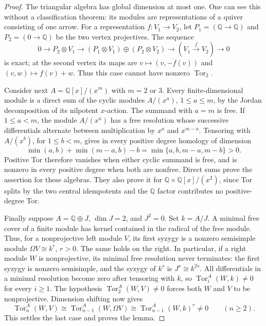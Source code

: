 \begin{proof}
The triangular algebra has global dimension at most one.  One can see
this without a classification theorem: its modules are representations
of a quiver consisting of one arrow.  For a representation
$f:V_1\longrightarrow V_2$, let $P_1=(\mathbb Q\to\mathbb Q)$
and $P_2=(0\to\mathbb Q)$ be the two vertex projectives.  The
sequence
\[
 0\longrightarrow P_2\otimes V_1
 \longrightarrow (P_1\otimes V_1)\oplus(P_2\otimes V_2)
 \longrightarrow (V_1\xrightarrow{f}V_2)\longrightarrow0
\]
is exact; at the second vertex its maps are
$v\mapsto(v,-f(v))$ and $(v,w)\mapsto f(v)+w$.
Thus this case cannot have nonzero $\operatorname{Tor}_2$.

Consider next $A=\mathbb Q[x]/(x^m)$ with $m=2$ or $3$.
Every finite-dimensional module is a direct sum of the cyclic modules
$A/(x^a)$, $1\leq a\leq m$, by the Jordan decomposition of its
nilpotent $x$-action.  The summand with $a=m$ is free.  If
$1\leq a<m$, the module $A/(x^a)$ has a free resolution whose
successive differentials alternate between multiplication by
$x^a$ and $x^{m-a}$.  Tensoring with $A/(x^b)$, for
$1\leq b<m$, gives in every positive degree homology of dimension
\[
  \min(a,b)+\min(m-a,b)-b
   =\min\{a,b,m-a,m-b\}>0.
\]
Positive Tor therefore vanishes when either cyclic summand is free,
and is nonzero in every positive degree when both are nonfree.
Direct sums prove the assertion for these algebras.  They also prove
it for $\mathbb Q\times\mathbb Q[x]/(x^2)$, since Tor splits by
the two central idempotents and the $\mathbb Q$ factor contributes
no positive-degree Tor.

Finally suppose $A=\mathbb Q\oplus J$, $\dim J=2$, and $J^2=0$.
Set $k=A/J$.  A minimal free cover of a finite module has kernel
contained in the radical of the free module.  Thus, for a nonprojective
left module $V$, its first syzygy is a nonzero semisimple module
$\Omega V\cong k^r$, $r>0$.  The same holds on the right.
In particular, if a right module $W$ is nonprojective, its minimal
free resolution never terminates: the first syzygy is nonzero
semisimple, and the syzygy of $k^s$ is $J^s\cong k^{2s}$.
All differentials in a minimal resolution become zero after
tensoring with $k$, so
$\operatorname{Tor}_i^A(W,k)\ne0$ for every $i\geq1$.
The hypothesis $\operatorname{Tor}_2^A(W,V)\ne0$ forces both
$W$ and $V$ to be nonprojective.  Dimension shifting now gives
\[
 \operatorname{Tor}_n^A(W,V)
 \cong\operatorname{Tor}_{n-1}^A(W,\Omega V)
 \cong\operatorname{Tor}_{n-1}^A(W,k)^r\ne0
 \qquad(n\geq2).
\]
This settles the last case and proves the lemma.
\end{proof}


